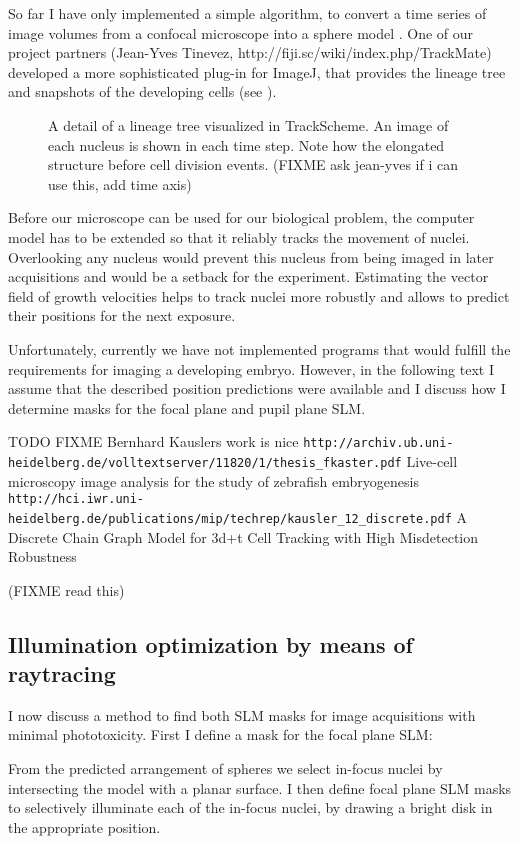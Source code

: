 So far I have only implemented a simple algorithm, to convert a time
series of image volumes from a confocal microscope into a sphere model
\citep{Santella2010}.
One of our project partners (Jean-Yves Tinevez,
http://fiji.sc/wiki/index.php/TrackMate) developed a more
sophisticated plug-in for ImageJ, that provides the lineage tree and
snapshots of the developing cells (see ).
\begin{figure}[!hbt] \centering
{}
  \caption{ A detail of a lineage tree visualized in TrackScheme. An
image of each nucleus is shown in each time step. Note how the
elongated structure before cell division events. (FIXME ask jean-yves
if i can use this, add time axis)}
  \label{fig:trackmate}
\end{figure} Before our microscope can be used for our biological
problem, the computer model has to be extended so that it reliably
tracks the movement of nuclei.  Overlooking any nucleus would prevent
this nucleus from being imaged in later acquisitions and would be a
setback for the experiment.  Estimating the vector field of growth
velocities helps to track nuclei more robustly and allows to predict
their positions for the next exposure.

Unfortunately, currently we have not implemented programs that would
fulfill the requirements for imaging a developing embryo.  However, in
the following text I assume that the described position predictions
were available and I discuss how I determine masks for the focal plane
and pupil plane SLM.

\cite{Murray2006}

TODO FIXME Bernhard Kauslers work is nice
\verb!http://archiv.ub.uni-heidelberg.de/volltextserver/11820/1/thesis_fkaster.pdf!
Live-cell microscopy image analysis for the study of zebrafish embryogenesis
\verb!http://hci.iwr.uni-heidelberg.de/publications/mip/techrep/kausler_12_discrete.pdf!
A Discrete Chain Graph Model for
  3d+t Cell Tracking with High
    Misdetection Robustness

(FIXME read this)


\subsection{Illumination optimization by means of raytracing} 
I now discuss a method to find both SLM masks for image acquisitions
with minimal phototoxicity. First I define a mask for the focal plane
SLM:

From the predicted arrangement of spheres we select in-focus nuclei by
intersecting the model with a planar surface. I then define focal
plane SLM masks to selectively illuminate each of the in-focus nuclei,
by drawing a bright disk in the appropriate position.

